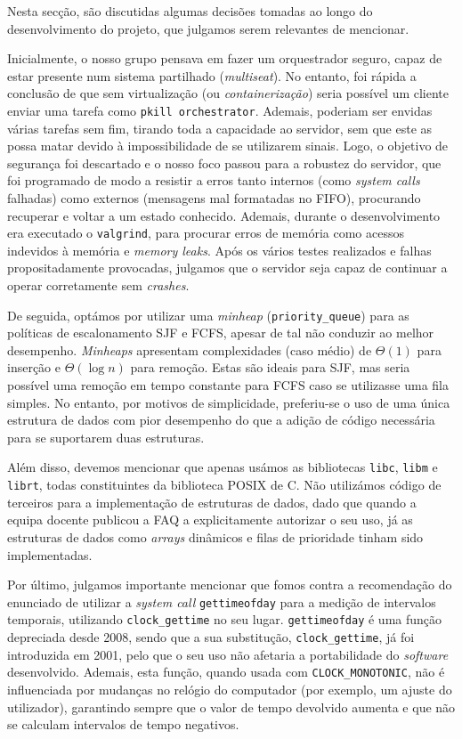 \documentclass[11pt]{article}
\begin{document}
Nesta secção, são discutidas algumas decisões tomadas ao longo do desenvolvimento do projeto, que
julgamos serem relevantes de mencionar.

Inicialmente, o nosso grupo pensava em fazer um orquestrador seguro, capaz de estar presente num
sistema partilhado (\emph{multiseat}). No entanto, foi rápida a conclusão de que sem virtualização
(ou \emph{containerização}) seria possível um cliente enviar uma tarefa como \texttt{pkill
orchestrator}. Ademais, poderiam ser envidas várias tarefas sem fim, tirando toda a capacidade ao
servidor, sem que este as possa matar devido à impossibilidade de se utilizarem sinais. Logo, o
objetivo de segurança foi descartado e o nosso foco passou para a robustez do servidor, que foi
programado de modo a resistir a erros tanto internos (como \emph{system calls} falhadas) como
externos (mensagens mal formatadas no FIFO), procurando recuperar e voltar a um estado conhecido.
Ademais, durante o desenvolvimento era executado o \texttt{valgrind}, para procurar erros de memória
como acessos indevidos à memória e \emph{memory leaks}. Após os vários testes realizados e falhas
propositadamente provocadas, julgamos que o servidor seja capaz de continuar a operar corretamente
sem \emph{crashes}.

De seguida, optámos por utilizar uma \emph{minheap} (\texttt{priority\_queue}) para as políticas de
escalonamento SJF e FCFS, apesar de tal não conduzir ao melhor desempenho. \emph{Minheaps}
apresentam complexidades (caso médio) de $\Theta(1)$ para inserção e $\Theta(\log n)$ para remoção.
Estas são ideais para SJF, mas seria possível uma remoção em tempo constante para FCFS caso se
utilizasse uma fila simples. No entanto, por motivos de simplicidade, preferiu-se o uso de uma única
estrutura de dados com pior desempenho do que a adição de código necessária para se suportarem duas
estruturas.

Além disso, devemos mencionar que apenas usámos as bibliotecas \texttt{libc}, \texttt{libm} e
\texttt{librt}, todas constituintes da biblioteca POSIX de C. Não utilizámos código de terceiros
para a implementação de estruturas de dados, dado que quando a equipa docente publicou a FAQ a
explicitamente autorizar o seu uso, já as estruturas de dados como \emph{arrays} dinâmicos e filas
de prioridade tinham sido implementadas.

Por último, julgamos importante mencionar que fomos contra a recomendação do enunciado de utilizar a
\emph{system call} \texttt{gettimeofday} para a medição de intervalos temporais, utilizando
\texttt{clock\_gettime} no seu lugar. \texttt{gettimeofday} é uma função depreciada desde 2008,
sendo que a sua substitução, \texttt{clock\_gettime}, já foi introduzida em 2001, pelo que o seu uso
não afetaria a portabilidade do \emph{software} desenvolvido. Ademais, esta função, quando usada com
\texttt{CLOCK\_MONOTONIC}, não é influenciada por mudanças no relógio do computador (por exemplo,
um ajuste do utilizador), garantindo sempre que o valor de tempo devolvido aumenta e que não se
calculam intervalos de tempo negativos.
\end{document}
